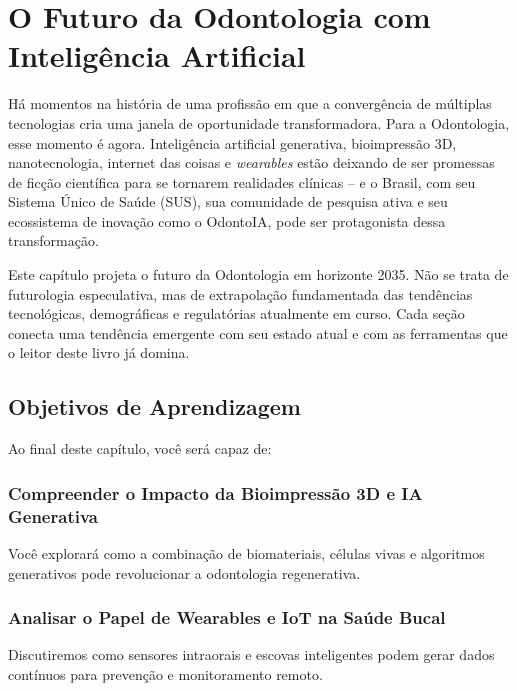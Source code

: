 \chapter{O Futuro da Odontologia com Inteligência Artificial}
\label{cap:futuro-odontologia}

\nivelquatro

Há momentos na história de uma profissão em que a convergência de múltiplas
tecnologias cria uma janela de oportunidade transformadora. Para a Odontologia,
esse momento é agora. Inteligência artificial generativa, bioimpressão 3D,
nanotecnologia, internet das coisas e \textit{wearables} estão deixando de ser
promessas de ficção científica para se tornarem realidades clínicas -- e o
Brasil, com seu Sistema Único de Saúde (SUS), sua comunidade de pesquisa ativa
e seu ecossistema de inovação como o OdontoIA, pode ser protagonista dessa
transformação.

Este capítulo projeta o futuro da Odontologia em horizonte 2035. Não se trata
de futurologia especulativa, mas de extrapolação fundamentada das tendências
tecnológicas, demográficas e regulatórias atualmente em curso. Cada seção
conecta uma tendência emergente com seu estado atual e com as ferramentas que
o leitor deste livro já domina.

 
 

\section{Objetivos de Aprendizagem}

Ao final deste capítulo, você será capaz de:

\subsection{Compreender o Impacto da Bioimpressão 3D e IA Generativa}
Você explorará como a combinação de biomateriais, células vivas e algoritmos generativos pode revolucionar a odontologia regenerativa.

\subsection{Analisar o Papel de Wearables e IoT na Saúde Bucal}
Discutiremos como sensores intraorais e escovas inteligentes podem gerar dados contínuos para prevenção e monitoramento remoto.

